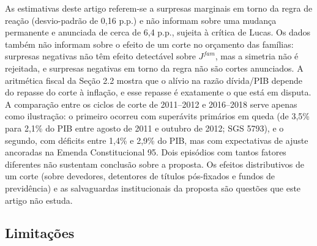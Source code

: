 \documentclass[12pt,a4paper]{article}
\begin{document}
As estimativas deste artigo referem-se a surpresas marginais em torno da regra de reação (desvio-padrão de 0,16 p.p.) e não informam sobre uma mudança permanente e anunciada de cerca de 6,4 p.p., sujeita à crítica de Lucas. Os dados também não informam sobre o efeito de um corte no orçamento das famílias: surpresas negativas não têm efeito detectável sobre $J^{fam}$, mas a simetria não é rejeitada, e surpresas negativas em torno da regra não são cortes anunciados. A aritmética fiscal da Seção 2.2 mostra que o alívio na razão dívida/PIB depende do repasse do corte à inflação, e esse repasse é exatamente o que está em disputa. A comparação entre os ciclos de corte de 2011--2012 e 2016--2018 serve apenas como ilustração: o primeiro ocorreu com superávits primários em queda (de 3,5\% para 2,1\% do PIB entre agosto de 2011 e outubro de 2012; SGS 5793), e o segundo, com déficits entre 1,4\% e 2,9\% do PIB, mas com expectativas de ajuste ancoradas na Emenda Constitucional 95. Dois episódios com tantos fatores diferentes não sustentam conclusão sobre a proposta. Os efeitos distributivos de um corte (sobre devedores, detentores de títulos pós-fixados e fundos de previdência) e as salvaguardas institucionais da proposta são questões que este artigo não estuda.

\subsection{Limitações}
\end{document}
